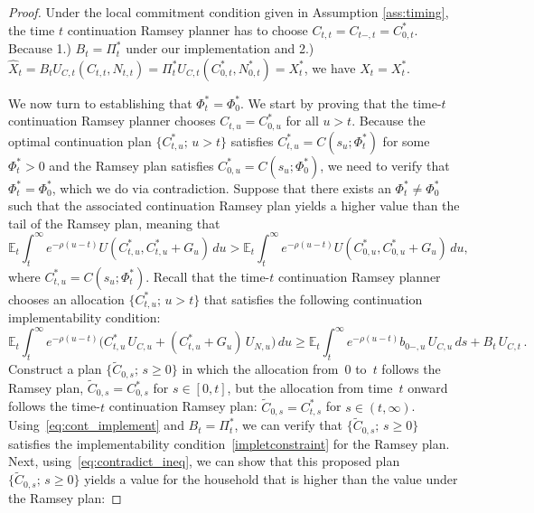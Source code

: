 \documentclass[12pt]{article}
\begin{document}
\begin{proof}
	
	
	Under the local commitment condition given in  Assumption \ref{ass:timing}, the time $t$ continuation Ramsey planner has to choose $C_{t, t}=C_{t-, t}=C_{0, t}^*$. Because 1.) ${B}_t =\Pi_t^*$ under our implementation and 2.) $\widehat{X}_t = {B}_tU_{C, t}(C_{t, t}, N_{t, t})= \Pi_{t}^*U_{C, t}(C_{0, t}^*, N_{0, t}^*) = X_t^*$, we have $\widehat{X}_t= X^*_t$. 
	
	
	
	
	
	
	{We now turn to establishing that $\Phi_t^* = \Phi_0^*$.} We start by  proving that the time-$t$ continuation Ramsey planner  chooses $C_{t,u} = C_{0, u}^*$ for all $u > t$. Because the optimal continuation plan $\{C_{t, u}^*;\, u > t\}$ satisfies $C_{t,u}^* = C(s_u; \Phi_t^*)$ for some $\Phi_t^* > 0$ and the Ramsey plan satisfies $C_{0,u}^* = C(s_u; \Phi_0^*)$, we need to verify that $\Phi_t^* = \Phi_0^*$, which 
	we do via contradiction. Suppose that there exists an $\Phi_t^* \ne \Phi_0^*$ such that the associated  continuation Ramsey plan yields a higher value than the tail of the Ramsey plan, meaning that
	\begin{equation}\label{eq:contradict_ineq}
	\mathbb{E}_t \int_t^\infty e^{-\rho(u-t)} U(C_{t,u}^*, C_{t,u}^*+G_u)\, du > \mathbb{E}_t \int_t^\infty e^{-\rho(u-t)} U(C_{0,u}^*, C_{0,u}^*+G_u)\, du,
	\end{equation}
	where $C_{t,u}^* = C(s_u; \Phi_t^*)$. Recall that the time-$t$ continuation Ramsey planner chooses an  allocation $\{C_{t,u}^*;\, u > t\}$ that satisfies the following continuation implementability condition:
	\begin{equation}\label{eq:cont_implement}
	\mathbb{E}_t	\int_t^\infty e^{-\rho(u-t)}\bigl(C_{t,u}^*\, U_{C,u} + (C_{t,u}^*+G_u)\, U_{N,u}\bigr)\, du \ge \mathbb{E}_t \int_t^\infty e^{-\rho(u-t)} b_{0-,u}\, U_{C,u}\, ds + B_t\, U_{C,t} \, .
	\end{equation}
	Construct a plan $\{\widetilde{C}_{0,s};\, s \ge 0\}$ in which  the allocation from~0 to~$t$ follows the Ramsey plan, $\widetilde{C}_{0,s} = C_{0,s}^*$ for $s \in [0,t]$, but the allocation from time~$t$ onward follows the time-$t$ continuation Ramsey plan: $\widetilde{C}_{0,s} = C_{t,s}^*$ for $s \in (t,\infty)$. Using~\eqref{eq:cont_implement} and $B_t = \Pi_t^*$, we can verify that $\{\widetilde{C}_{0,s};\, s \ge 0\}$ satisfies the implementability condition~\eqref{impletconstraint} for the Ramsey plan. Next, using~\eqref{eq:contradict_ineq}, we can show that this proposed plan $\{\widetilde{C}_{0,s};\, s \ge 0\}$ yields a value for the household that is higher than the value under the Ramsey plan:

\end{proof}
\end{document}
